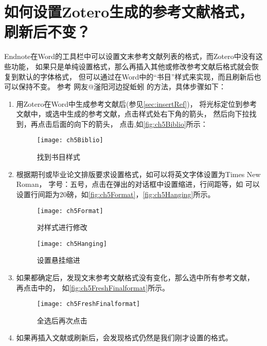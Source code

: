 \documentclass[cn,11pt,chinese]{elegantbook}
\begin{document}
		\section{如何设置Zotero生成的参考文献格式，刷新后不变？}\label{sec:refresh}
		Endnote在Word的工具栏中可以设置文末参考文献列表的格式，而Zotero中没有这些功能，
		如果只是单纯设置格式，那么再插入其他或修改参考文献后格式就会恢复到默认的字体格式，
		但可以通过在Word中的“书目”样式来实现，而且刷新后也可以保持不变。
		参考 网友@滏阳河边捉蚯蚓 的方法，具体步骤如下：
			\begin{enumerate}
				\item
				用Zotero在Word中生成参考文献后(参见\cref{sec:insertRef})，
				将光标定位到参考文献中，或选中生成的参考文献，点击样式处右下角的箭头，
				然后向下拉找到\menu{书目}，再点击后面的向下的箭头，
				点击,如\autoref{fig:ch5Biblio}所示：
		    		\begin{figure}[htbp]
			    		\centering
			    		\texttt{[image: ch5Biblio]}
			    		\caption{找到书目样式}
			    		\label{fig:ch5Biblio}
		    	  \end{figure}
		    	\item
				根据期刊或毕业论文排版要求设置格式，如可以将英文字体设置为Times New Roman，
				字号：五号，点击在弹出的对话框中设置缩进，行间距等，如
				可以设置行间距为20磅，如\autoref{fig:ch5Format}，\autoref{fig:ch5Hanging}所示。
			    	\begin{figure}[t]
			    		\centering
			    		\texttt{[image: ch5Format]}
			    		\caption{对样式进行修改}
			    		\label{fig:ch5Format}
			    	\end{figure}
		    	 
			    	\begin{figure}[htbp]
			    		\centering
			    		\texttt{[image: ch5Hanging]}
			    		\caption{设置悬挂缩进}
			    		\label{fig:ch5Hanging}
			    	\end{figure}
		    	\item
				 如果都确定后，发现文末参考文献格式没有变化，那么选中所有参考文献，
				 再点击中的，
				 如\autoref{fig:ch5FreshFinalformat}所示。
			    	\begin{figure}[htbp]
			    		\centering
			    		\texttt{[image: ch5FreshFinalformat]}
			    		\caption{全选后再次点击}
			    		\label{fig:ch5FreshFinalformat}
			    	\end{figure}
		    	\item
		    	如果再插入文献或刷新后，会发现格式仍然是我们刚才设置的格式。
			\end{enumerate}
			
\end{document}
